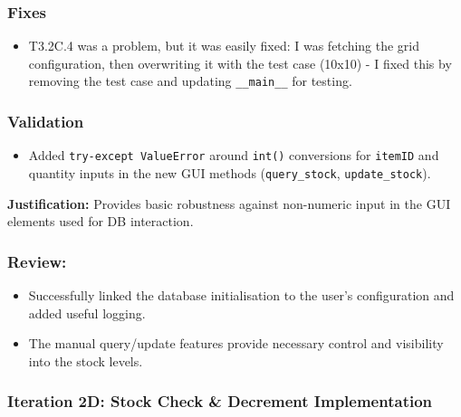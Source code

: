 \subsubsection{Fixes}
\begin{itemize}
	\item T3.2C.4 was a problem, but it was easily fixed: I was fetching the grid configuration, then overwriting it with the test case (10x10) - I fixed this by removing the test case and updating \verb|__main__| for testing.
\end{itemize}

\subsubsection{Validation}
\begin{itemize}
	\item Added \verb|try-except ValueError| around \verb|int()| conversions for \verb|itemID| and quantity inputs in the new GUI methods (\verb|query_stock|, \verb|update_stock|).
\end{itemize}
\textbf{Justification:} Provides basic robustness against non-numeric input in the GUI elements used for DB interaction.

\subsubsection{Review:}
\begin{itemize}
	\item Successfully linked the database initialisation to the user's configuration and added useful logging.
	\item The manual query/update features provide necessary control and visibility into the stock levels.
\end{itemize}

\newpage

\subsubsection{Iteration 2D: Stock Check \& Decrement Implementation}

